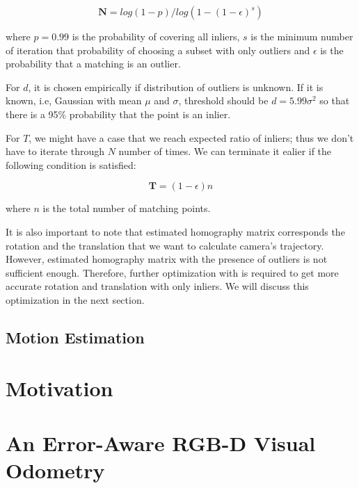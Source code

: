 \documentclass[a4paper]{report}
\numberwithin{figure}{section}
\begin{document}
\begin{equation}
  \mathbf{N} = log(1-p)/log(1-(1-\epsilon)^s)
\end{equation}

where $p=0.99$ is the probability of covering all inliers, $s$ is the 
minimum number of iteration that 
probability of choosing a subset with only outliers 
and $\epsilon$ is the probability that a matching is an outlier.

For $d$, it is chosen empirically if distribution of outliers is unknown. If 
it is known, i.e, Gaussian with mean $\mu$ and $\sigma$, threshold should 
be $d=5.99\sigma^2$ so that there is a 95\% probability that the point is an inlier.

For $T$, we might have a case that we reach expected ratio of inliers; thus 
we don't have to iterate through $N$ number of times. We can terminate it 
ealier if the following condition is satisfied:

\begin{equation}
  \mathbf{T} = (1-\epsilon)n
\end{equation}

where $n$ is the total number of matching points.

It is also important 
to note that estimated homography matrix corresponds the rotation and the 
translation that we want to calculate camera's trajectory. However, 
estimated homography matrix with the presence of outliers is not sufficient 
enough. Therefore, further optimization with is required to get more 
accurate rotation and translation with only inliers. We will discuss this 
optimization in the next section.


\section{Motion Estimation} \label{sc_motion_estim}

\chapter{Motivation} \label{cp_motivation}

\chapter{An Error-Aware RGB-D Visual Odometry} \label{cp_covo}
\end{document}
